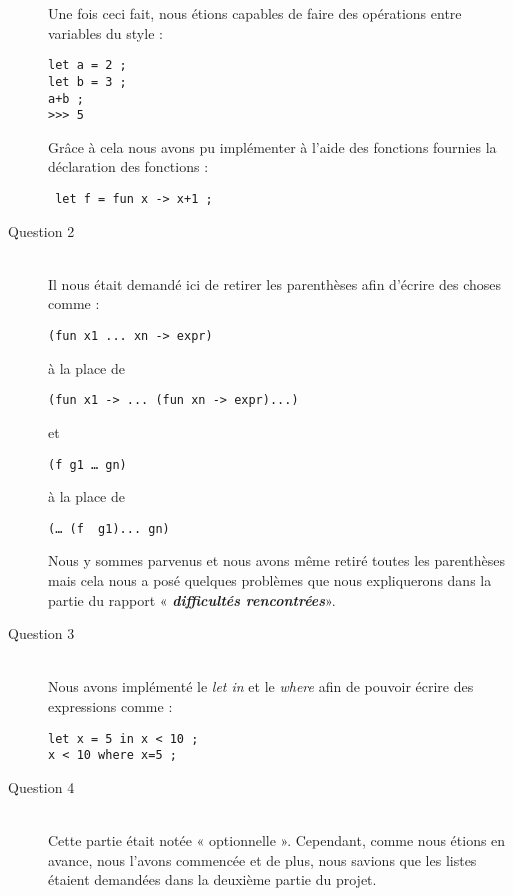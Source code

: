 \documentclass{article}
\begin{document}
\begin{description}
  
  \bigskip
  Une fois ceci fait, nous étions capables de faire des opérations entre variables du style :
  \bigskip
\begin{verbatim}
let a = 2 ;
let b = 3 ;
a+b ;
>>> 5
\end{verbatim}
\bigskip
Grâce à cela nous avons pu implémenter à l'aide des fonctions fournies la déclaration des fonctions :
\bigskip
\begin{verbatim}
 let f = fun x -> x+1 ;
\end{verbatim}
\bigskip  

\item[Question 2]\hfill \\
Il nous était demandé ici de retirer les parenthèses afin d'écrire des choses comme :

\begin{verbatim}
(fun x1 ... xn -> expr)   
\end{verbatim}


à la place de


\begin{verbatim}
(fun x1 -> ... (fun xn -> expr)...) 
\end{verbatim}


et


\begin{verbatim}
(f g1 … gn)  
\end{verbatim}


à la place de 


\begin{verbatim}
(… (f  g1)... gn) 
\end{verbatim}


	Nous y sommes parvenus et nous avons même retiré toutes les parenthèses mais cela nous a posé quelques problèmes que nous expliquerons dans la partie du rapport « \textbf{\emph{difficultés rencontrées}}».

 \item[Question 3]\hfill \\ 
 Nous avons implémenté le \emph{let in} et le \emph{where} afin de pouvoir écrire des expressions comme : 
 \bigskip
\begin{verbatim}
let x = 5 in x < 10 ;
x < 10 where x=5 ;
\end{verbatim}

\item[Question 4]\hfill \\ 
Cette partie était notée « optionnelle ». Cependant, comme nous étions en avance, nous l'avons commencée et de plus, nous savions que les listes étaient demandées dans la deuxième partie du projet.
  
\end{description}
\end{document}
